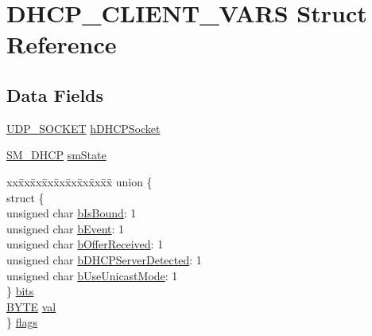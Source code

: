 \hypertarget{struct_d_h_c_p___c_l_i_e_n_t___v_a_r_s}{}\section{D\+H\+C\+P\+\_\+\+C\+L\+I\+E\+N\+T\+\_\+\+V\+A\+R\+S Struct Reference}
\label{struct_d_h_c_p___c_l_i_e_n_t___v_a_r_s}
\subsection*{Data Fields}
\begin{DoxyCompactItemize}
\item 
\hyperlink{_u_d_p_8h_a74f1b6fad75426b918419bbf943179c3}{U\+D\+P\+\_\+\+S\+O\+C\+K\+E\+T} \hyperlink{struct_d_h_c_p___c_l_i_e_n_t___v_a_r_s_a008ecdfa1d84321f5d509fd1139e3ad8}{h\+D\+H\+C\+P\+Socket}
\item 
\hyperlink{_d_h_c_p_8h_a65dc2b06b66bd0e82db77d461f903a7e}{S\+M\+\_\+\+D\+H\+C\+P} \hyperlink{struct_d_h_c_p___c_l_i_e_n_t___v_a_r_s_a8406e181d89fff1ed38770d6a8008977}{sm\+State}
\item 
\begin{tabbing}
xx\=xx\=xx\=xx\=xx\=xx\=xx\=xx\=xx\=\kill
union \{\\
\>struct \{\\
\>\>unsigned char \hyperlink{struct_d_h_c_p___c_l_i_e_n_t___v_a_r_s_a9ae6fdd6f8fde7013b1ed4720552ba72}{bIsBound}: 1\\
\>\>unsigned char \hyperlink{struct_d_h_c_p___c_l_i_e_n_t___v_a_r_s_accc0eabd359c539ae32cdbee2d8e051a}{bEvent}: 1\\
\>\>unsigned char \hyperlink{struct_d_h_c_p___c_l_i_e_n_t___v_a_r_s_a490b8525f41b237c6214263284d311c4}{bOfferReceived}: 1\\
\>\>unsigned char \hyperlink{struct_d_h_c_p___c_l_i_e_n_t___v_a_r_s_a723ee5c123c6c0186388af98333428be}{bDHCPServerDetected}: 1\\
\>\>unsigned char \hyperlink{struct_d_h_c_p___c_l_i_e_n_t___v_a_r_s_acc7e9f4bab542c71f3249d42bedac698}{bUseUnicastMode}: 1\\
\>\} \hyperlink{struct_d_h_c_p___c_l_i_e_n_t___v_a_r_s_a21158eb353e13b4221be5ac306d9f1de}{bits}\\
\>\hyperlink{_generic_type_defs_8h_a4ae1dab0fb4b072a66584546209e7d58}{BYTE} \hyperlink{struct_d_h_c_p___c_l_i_e_n_t___v_a_r_s_a5986ea8162aa0f6608b36b20964044dd}{val}\\
\} \hyperlink{struct_d_h_c_p___c_l_i_e_n_t___v_a_r_s_a95e19ef61e504dab9046841d5f2d6af5}{flags}\\


\end{tabbing}
\end{DoxyCompactItemize}
